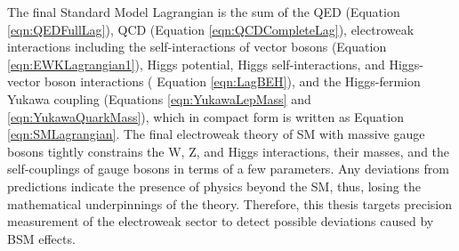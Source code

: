 The final Standard Model Lagrangian is the sum of the QED (Equation \ref{eqn:QEDFullLag}), QCD (Equation \ref{eqn:QCDCompleteLag}), electroweak interactions including the self-interactions of vector bosons (Equation \ref{eqn:EWKLagrangian1}), Higgs potential, Higgs self-interactions, and Higgs-vector boson interactions ( Equation \ref{eqn:LagBEH}), and the Higgs-fermion Yukawa coupling (Equations \ref{eqn:YukawaLepMass} and \ref{eqn:YukawaQuarkMass}), which in compact form is written as Equation \ref{eqn:SMLagrangian}. The final electroweak theory of SM with massive gauge bosons tightly constrains the W, Z, and Higgs interactions, their masses, and the self-couplings of gauge bosons in terms of a few parameters. Any deviations from predictions indicate the presence of physics beyond the SM, thus, losing the mathematical underpinnings of the theory. Therefore, this thesis targets precision measurement of the electroweak sector to detect possible deviations caused by BSM effects.